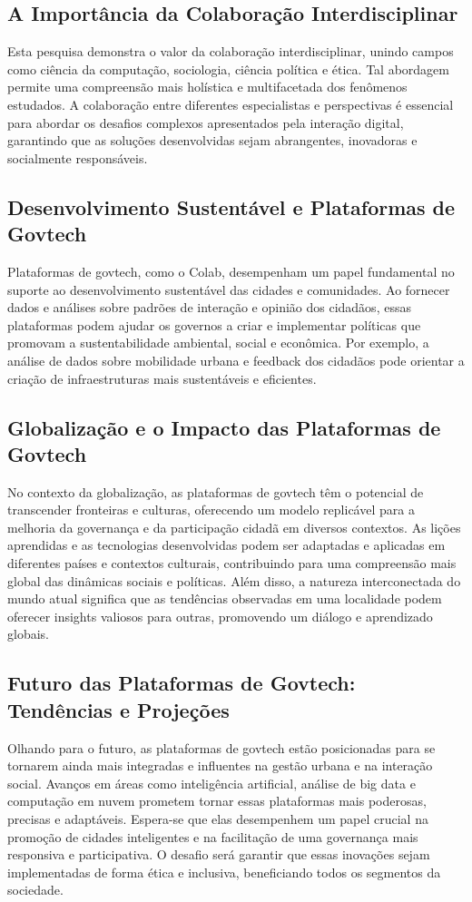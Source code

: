 \subsection*{A Importância da Colaboração Interdisciplinar}
Esta pesquisa demonstra o valor da colaboração interdisciplinar, unindo campos como ciência da computação, sociologia, ciência política e ética. Tal abordagem permite uma compreensão mais holística e multifacetada dos fenômenos estudados. A colaboração entre diferentes especialistas e perspectivas é essencial para abordar os desafios complexos apresentados pela interação digital, garantindo que as soluções desenvolvidas sejam abrangentes, inovadoras e socialmente responsáveis.

\subsection*{Desenvolvimento Sustentável e Plataformas de Govtech}
Plataformas de govtech, como o Colab, desempenham um papel fundamental no suporte ao desenvolvimento sustentável das cidades e comunidades. Ao fornecer dados e análises sobre padrões de interação e opinião dos cidadãos, essas plataformas podem ajudar os governos a criar e implementar políticas que promovam a sustentabilidade ambiental, social e econômica. Por exemplo, a análise de dados sobre mobilidade urbana e feedback dos cidadãos pode orientar a criação de infraestruturas mais sustentáveis e eficientes.

\subsection*{Globalização e o Impacto das Plataformas de Govtech}
No contexto da globalização, as plataformas de govtech têm o potencial de transcender fronteiras e culturas, oferecendo um modelo replicável para a melhoria da governança e da participação cidadã em diversos contextos. As lições aprendidas e as tecnologias desenvolvidas podem ser adaptadas e aplicadas em diferentes países e contextos culturais, contribuindo para uma compreensão mais global das dinâmicas sociais e políticas. Além disso, a natureza interconectada do mundo atual significa que as tendências observadas em uma localidade podem oferecer insights valiosos para outras, promovendo um diálogo e aprendizado globais.

\subsection*{Futuro das Plataformas de Govtech: Tendências e Projeções}
Olhando para o futuro, as plataformas de govtech estão posicionadas para se tornarem ainda mais integradas e influentes na gestão urbana e na interação social. Avanços em áreas como inteligência artificial, análise de big data e computação em nuvem prometem tornar essas plataformas mais poderosas, precisas e adaptáveis. Espera-se que elas desempenhem um papel crucial na promoção de cidades inteligentes e na facilitação de uma governança mais responsiva e participativa. O desafio será garantir que essas inovações sejam implementadas de forma ética e inclusiva, beneficiando todos os segmentos da sociedade.

